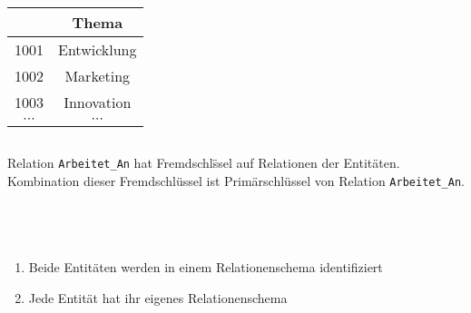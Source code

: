 \begin{frame}[t]
\begin{columns}
\begin{column}{.33\textwidth}
\begin{center}
\begin{tabular}{|c|c|}
				\cellcolor{Green}\small \textbf{\key{ProNr}} & \small \textbf{Thema}  \\\hline 
				\cellcolor{Green}\small 1001 &\small Entwicklung \\\hline 
				\cellcolor{Green}\small 1002 &\small Marketing \\\hline 
				\cellcolor{Green}\small 1003 &\small Innovation \\\hline 
				\cellcolor{Green}$\cdots$ & $\cdots$  \\\hline
			\end{tabular}
		\end{center}
	\end{column}
\end{columns}
\vspace{5mm}
Relation \texttt{Arbeitet\_An} hat Fremdschl\"ssel auf Relationen der Entit\"aten.\\
Kombination dieser Fremdschl\"ussel ist Prim\"arschl\"ussel von Relation \texttt{Arbeitet\_An}.\\
\end{frame}

\begin{frame}[t]
\frametitle{\insertsection}
\framesubtitle{\insertsubsection}    
\\[4pt]
\\[2pt]
\begin{enumerate}
	\item Beide Entit\"aten werden in einem Relationenschema identifiziert
	\item Jede Entit\"at hat ihr eigenes Relationenschema
\end{enumerate}
\end{frame}

